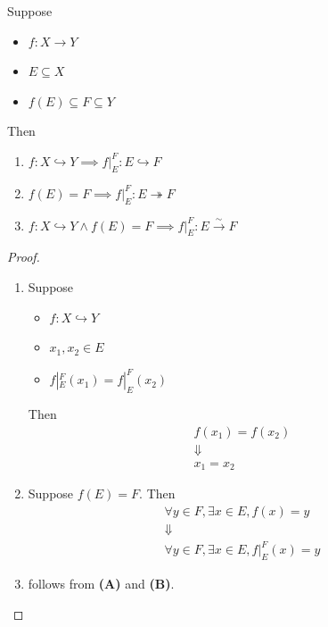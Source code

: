 \begin{theorem} \label{an1:thm:properties-of-restriction-functions}
  Suppose
  \begin{itemize}
    \item $f: X \to Y$
    \item $E \subseteq X$
    \item $f(E) \subseteq F \subseteq Y$
  \end{itemize}
  Then
  \begin{enumerate}[label=\textbf{(\Alph*)}]
    \item $f: X \hookrightarrow Y \implies f|_{E}^{F}: E \hookrightarrow F$
    \item $f(E) = F \implies f|_{E}^{F}: E \twoheadrightarrow F$
    \item $f: X \hookrightarrow Y \land f(E) = F \implies f|_{E}^{F}: E \xrightarrow{\sim} F$
  \end{enumerate}
\end{theorem}

\begin{proof}
  \leavevmode\par
  \begin{enumerate}[label=\textbf{(\Alph*)}]
    \item Suppose
          \begin{itemize}
            \item $f: X \hookrightarrow Y$
            \item $x_{1}, x_{2} \in E$
            \item  $f|_{E}^{F}(x_{1}) = f|_{E}^{F}(x_{2})$
          \end{itemize}
          Then
          \[
            \begin{array}{c}
              f(x_{1}) = f(x_{2}) \\
              \Downarrow          \\
              x_{1} = x_{2}
            \end{array}
          \]
    \item Suppose $f(E) = F$. Then
          \[
            \begin{array}{c}
              \forall y \in F, \exists x \in E, f(x) = y \\
              \Downarrow                                 \\
              \forall y \in F, \exists x \in E, f|_{E}^{F}(x) = y
            \end{array}
          \]
    \item follows from \textbf{(A)} and \textbf{(B)}.
  \end{enumerate}
\end{proof}

